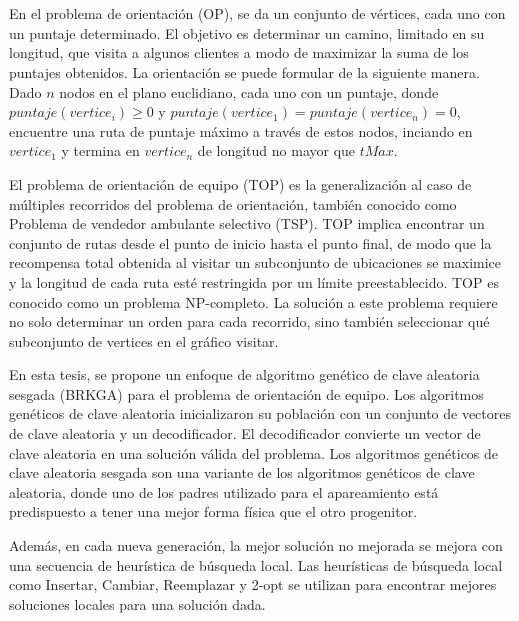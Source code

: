 
\chapter*{\tituloAbstractEs}

\noindent En el problema de orientación (OP), se da un conjunto de vértices, cada uno con un puntaje determinado. El objetivo es determinar un camino, limitado en su longitud, que visita a algunos clientes a modo de maximizar la suma de los puntajes obtenidos. La orientación se puede formular de la siguiente manera. Dado $n$ nodos en el plano euclidiano, cada uno con un puntaje, donde $puntaje(vertice_i) \geq 0$ y $puntaje(vertice_1) = puntaje(vertice_n) = 0$, encuentre una ruta de puntaje máximo a través de estos nodos, inciando en $vertice_1$ y termina en $vertice_n$ de longitud no mayor que $tMax$.

\bigskip

El problema de orientación de equipo (TOP) es la generalización al caso de múltiples recorridos del problema de orientación, también conocido como Problema de vendedor ambulante selectivo (TSP). TOP implica encontrar un conjunto de rutas desde el punto de inicio hasta el punto final, de modo que la recompensa total obtenida al visitar un subconjunto de ubicaciones se maximice y la longitud de cada ruta esté restringida por un límite preestablecido. TOP es conocido como un problema NP-completo. La solución a este problema requiere no solo determinar un orden para cada recorrido, sino también seleccionar qué subconjunto de vertices en el gráfico visitar.

\bigskip

En esta tesis, se propone un enfoque de algoritmo genético de clave aleatoria sesgada (BRKGA) para el problema de orientación de equipo. Los algoritmos genéticos de clave aleatoria inicializaron su población con un conjunto de vectores de clave aleatoria y un decodificador. El decodificador convierte un vector de clave aleatoria en una solución válida del problema. Los algoritmos genéticos de clave aleatoria sesgada son una variante de los algoritmos genéticos de clave aleatoria, donde uno de los padres utilizado para el apareamiento está predispuesto a tener una mejor forma física que el otro progenitor.

\bigskip

Además, en cada nueva generación, la mejor solución no mejorada se mejora con una secuencia de heurística de búsqueda local. Las heurísticas de búsqueda local como Insertar, Cambiar, Reemplazar y 2-opt se utilizan para encontrar mejores soluciones locales para una solución dada.

